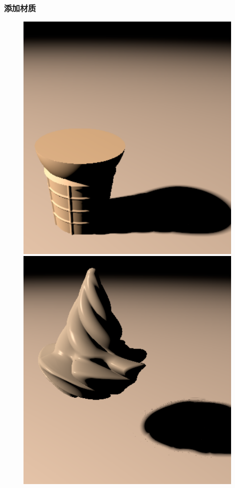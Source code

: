 \documentclass[aspectratio=169]{ctexbeamer} %
\begin{document}
\begin{frame}
    \frametitle{添加材质}
    \begin{figure}[htbp]
        \centering
        \includegraphics[height=.47\textheight]{images/pre/material/cone.pdf}
        \includegraphics[height=.47\textheight]{images/pre/material/cream.pdf}

\end{figure}
\end{frame}
\end{document}
